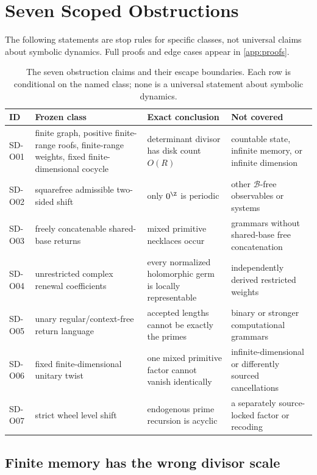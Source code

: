 \section{Seven Scoped Obstructions}
\label{sec:obstructions}

The following statements are stop rules for specific classes, not universal
claims about symbolic dynamics.  Full proofs and edge cases appear in
\cref{app:proofs}.

\begin{table}[t]
\centering
\caption{The seven obstruction claims and their escape boundaries. Each row
is conditional on the named class; none is a universal statement about
symbolic dynamics.}
\label{tab:obstructions}
\footnotesize
\begin{tabularx}{\textwidth}{@{}l>{\raggedright\arraybackslash}p{}>{\raggedright\arraybackslash}X>{\raggedright\arraybackslash}p{}@{}}
\toprule
ID & Frozen class & Exact conclusion & Not covered \\
\midrule
SD-O01 & finite graph, positive finite-range roofs, finite-range weights, fixed finite-dimensional cocycle & determinant divisor has disk count \(O(R)\) & countable state, infinite memory, or infinite dimension \\
SD-O02 & squarefree admissible two-sided shift & only \(0^{\Z}\) is periodic & other \(\mathscr B\)-free observables or systems \\
SD-O03 & freely concatenable shared-base returns & mixed primitive necklaces occur & grammars without shared-base free concatenation \\
SD-O04 & unrestricted complex renewal coefficients & every normalized holomorphic germ is locally representable & independently derived restricted weights \\
SD-O05 & unary regular/context-free return language & accepted lengths cannot be exactly the primes & binary or stronger computational grammars \\
SD-O06 & fixed finite-dimensional unitary twist & one mixed primitive factor cannot vanish identically & infinite-dimensional or differently sourced cancellations \\
SD-O07 & strict wheel level shift & endogenous prime recursion is acyclic & a separately source-locked factor or recoding \\
\bottomrule
\end{tabularx}
\end{table}

\subsection{Finite memory has the wrong divisor scale}

